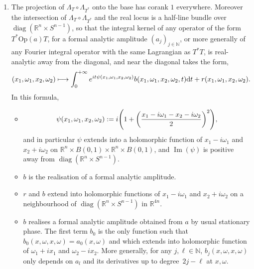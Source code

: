 \documentclass[AHL,Unicode,longabstracts,published]{cedram}
\DeclareMathOperator{\diag}{diag}
\DeclareMathOperator{\im}{Im}
\newcommand{\Opp}{\mathrm{Op}}
\newcommand\1{\mathds{1}}
\newcommand{\R}{\mathbb{R}}
\newcommand{\N}{\mathbb{N}}
\newcommand{\dd}{\mathrm{d}}
\let\oldmapsto\mapsto
\renewcommand*{\mapsto}{\mathchoice{\longmapsto}{\oldmapsto}{\oldmapsto}{\oldmapsto}}
\let\originalleft\left
\let\originalright\right
\renewcommand{\left}{\mathopen{}\mathclose\bgroup\originalleft}
\renewcommand{\right}{\aftergroup\egroup\originalright}
\begin{document}
\begin{prop}
\begin{enumerate}
\item\label{prop4.19.3} The projection of $\Lambda_{T}\circ\Lambda_{T^*}$ onto the base has corank $1$ everywhere. Moreover the intersection of $\Lambda_{T}\circ\Lambda_{T^*}$ and the real locus is a half-line bundle over $\diag(\R^{n}\times S^{n-1})$, so that the integral kernel of any operator of the form $T^*\Opp(a)T$, for a formal analytic amplitude $(a_j)_{j\in \N}$, or more generally of any Fourier integral operator with the same Lagrangian as $T^*T$, is real-analytic away from the diagonal, and near the diagonal takes the form,
\[
(x_1,\omega_1,x_2,\omega_2)\mapsto
\int_0^{+\infty}e^{it\psi(x_1,\omega_1,x_2,\omega_2)}b(x_1,\omega_1,x_2,\omega_2,t)\dd t+r(x_1,\omega_1,x_2,\omega_2).
\]
In this formula,
\begin{itemize}
\item
\begin{equation}\label{eq:phase_Toep}
\psi(x_1,\omega_1,x_2,\omega_2):=i\left(1+\left(\frac{x_1-i\omega_1-x_2-i\omega_2}{2}\right)^2\right),
\end{equation}
and in particular $\psi$ extends into a holomorphic function of $x_1-i\omega_1$ and $x_2+i\omega_2$ on $\R^n\times B(0,1)\times
\R^n\times B(0,1)$, and $\im(\psi)$ is positive away from $\diag(\R^n\times S^{n-1})$.
\item $b$ is the realisation of a formal analytic amplitude.
\item $r$ and $b$ extend into holomorphic functions of $x_1-i\omega_1$ and $x_2+i\omega_2$ on a neighbourhood of $\diag(\R^n\times S^{n-1})$ in $\R^{4n}$.
\item $b$ realises a formal analytic amplitude obtained from $a$ by usual stationary phase. The first term $b_0$ is the only function such that $b_0(x,\omega,x,\omega)=a_0(x,\omega)$ and which extends into holomorphic function of $\omega_1+ix_1$ and $\omega_2-ix_2$. More generally, for any $j,\ell\in \N$, $b_j(x,\omega,x,\omega)$ only depends on $a_l$ and its derivatives up to degree~$2j-\ell$ at $x,\omega$.
\end{itemize}
\end{enumerate}
\end{prop}
\end{document}
